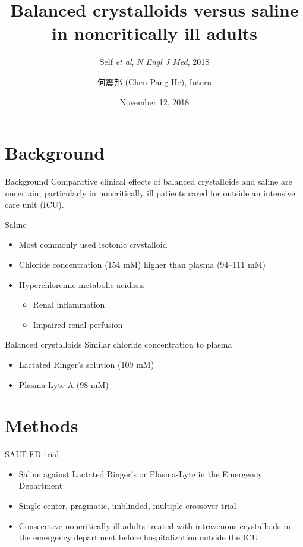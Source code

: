 \documentclass{beamer}
\title[(Self \textit{et al}, 2018)]{Balanced crystalloids versus saline in noncritically ill adults}
\subtitle{Self \textit{et al}, \textit{N Engl J Med}, 2018}
\author[Chen-Pang He]{何震邦 (Chen-Pang He), Intern}
\date{November 12, 2018}
\institute[CGH]{Cathay General Hospital}
\begin{document}
\maketitle

\section{Background}
\begin{frame}{Background}
    Comparative clinical effects of balanced crystalloids and saline are
    uncertain, particularly in noncritically ill patients cared for outside an
    intensive care unit (ICU).
\end{frame}

\begin{frame}{Saline}
    \begin{itemize}
        \item Most commonly used isotonic crystalloid
        \item Chloride concentration (154 mM) higher than plasma (94--111 mM)
        \item Hyperchloremic metabolic acidosis
            \begin{itemize}
                \item Renal inflammation
                \item Impaired renal perfusion
            \end{itemize}
    \end{itemize}
\end{frame}

\begin{frame}{Balanced crystalloids}
    Similar chloride concentration to plasma
    \begin{itemize}
        \item Lactated Ringer's solution (109 mM)
        \item Plasma-Lyte A (98 mM)
    \end{itemize}
\end{frame}

\section{Methods}
\begin{frame}{SALT-ED trial}
    \begin{itemize}
        \item Saline against Lactated Ringer's or Plasma-Lyte in the Emergency Department
        \item Single-center, pragmatic, unblinded, multiple-crossover trial
        \item Consecutive noncritically ill adults treated with intravenous
            crystalloids in the emergency department before hospitalization
            outside the ICU
    \end{itemize}
\end{frame}
\end{document}
